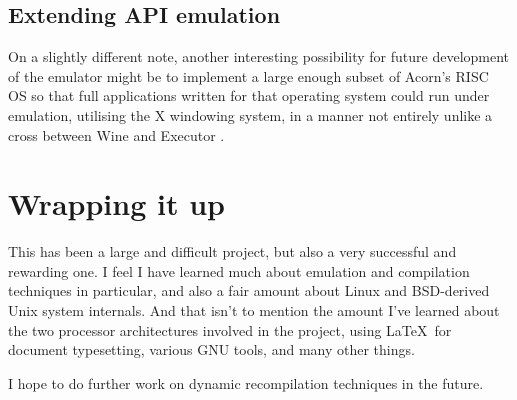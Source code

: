 \subsection{Extending API emulation}

On a slightly different note, another interesting possibility for future development of the emulator might be to implement a large enough subset of Acorn's RISC OS so that full applications written for that operating system could run under emulation, utilising the X windowing system, in a manner not entirely unlike a cross between Wine \cite{Wine} and Executor \cite{Executor}.

\section{Wrapping it up}

This has been a large and difficult project, but also a very successful and rewarding one. I feel I have learned much about emulation and compilation techniques in particular, and also a fair amount about Linux and BSD-derived Unix system internals. And that isn't to mention the amount I've learned about the two processor architectures involved in the project, using \LaTeX\ for document typesetting, various GNU tools, and many other things.

I hope to do further work on dynamic recompilation techniques in the future.
